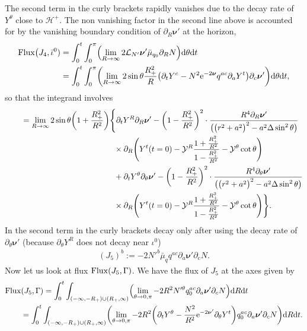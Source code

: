 \documentclass[11pt]{article}
\numberwithin{equation}{section}
\def\ptl{\partial}%
\def\mbo#1{\boldsymbol{#1}}%
\numberwithin{equation}{section}
\begin{document}
The second term in the curly brackets rapidly vanishes due to the decay rate of $Y^ \theta$ close to $\mathcal{H}^+$. The non vanishing factor in the second line above is accounted for by the vanishing boundary condition of $\ptl_R \mbo{\nu}'$ at the horizon,
\begin{align*}
{\rm Flux} \bigl(J_4, \bar{\iota}^0) &{}= \int^t_0 \int^\pi _0 \Bigl(\lim_{R \to \infty} 2 \mathcal{L}_{N'} \mbo{\nu}' \bar{\mu}_{q_0} \ptl_R N \Bigr) {\rm d}\theta {\rm d}t \notag \\
&{}= \int^t_0 \int^\pi _0 \biggl( \lim_{R \to \infty} 2 \sin \theta \frac{R^2_+}{R} \bigl(\ptl_t Y^c - N^2 {\rm e}^{-2 \mbo{\nu}} q^{ac} \ptl_a Y^t\bigr) \ptl_c \mbo{\nu}' \biggr) {\rm d} \theta {\rm d}t,
\end{align*}
so that the integrand involves
\begin{align*}
\qquad{} &{}= \lim_{R \to \infty} 2 \sin \theta \biggl(1+ \frac{R^2_+}{R^2} \biggr) \Biggl\{ \ptl_t Y^R \ptl_R \mbo{\nu}' - \biggl(1- \frac{R^2_+}{R^2} \biggr)^2 \cdot \frac{R^4 \ptl_R \mbo{\nu}'}{ \bigl(\bigl(r^2+a^2\bigr)^2 -a^2 \Delta
 	\sin^2 \theta \bigr)} \notag\\
 & \hphantom{= \lim_{R \to \infty} 2 \sin \theta \biggl(1+ \frac{R^2_+}{R^2} \biggr) \Biggl\{}{}
 \times \ptl_R \Biggl(Y^t (t=0) - \mathcal{Y}^R \frac{1 + \frac{R^2_+}{R^2}} {{1-\frac{R^2_+}{R^2}} } - \mathcal{Y}^ \theta \cot \theta \Biggr) \notag\\
 & \hphantom{= \lim_{R \to \infty} 2 \sin \theta \biggl(1+ \frac{R^2_+}{R^2} \biggr) \Biggl\{}{}
 + \ptl_t Y^ \theta \ptl_\theta \mbo{\nu}' - \biggl(1 - \frac{R^2_+}{R^2} \biggr)^2 \cdot \frac{R^4 \ptl_\theta \mbo{\nu}'}{ \bigl(\bigl(r^2+a^2\bigr)^2 -a^2 \Delta \sin^2 \theta\bigr)} \notag\\
 & \hphantom{= \lim_{R \to \infty} 2 \sin \theta \biggl(1+ \frac{R^2_+}{R^2} \biggr) \Biggl\{}{}
 \times \ptl_R \Biggl(Y^t(t=0) - \mathcal{Y}^R \frac{1+ \frac{R^2_+}{R^2}}{1-\frac{R^2_+}{R^2}} - \mathcal{Y}^\theta \cot \theta \Biggr) \Biggr\}.
\end{align*}
In the second term in the curly brackets decay only after using the decay rate of $\ptl_ \theta \mbo{\nu}'$ \big(because $ \ptl_\theta Y^R$ does not decay near $\iota^0$\big)
\begin{align*}
(J_5)^b := -2N'^b \bar{\mu}_q q^{ac} \ptl_a \mbo{\nu}' \ptl_c N.
\end{align*}
Now let us look at flux
${\rm Flux} (J_5, \Gamma)$.
We have the flux of $J_5$ at the axes given by
\begin{align*}
&{\rm Flux} (J_5, \Gamma)= \int^t_0 \int_{(-\infty, -R_+) \cup (R_+, \infty)} \Bigl(\lim_{\theta \to 0, \pi}-2 R^2 N'^ \theta q^{ac}_0 \ptl_a \mbo{\nu}' \ptl_c N\Bigr) {\rm d}R {\rm d}t \\
&\qquad{}= \int^t_0 \int_{(-\infty, -R_+) \cup (R_+, \infty)} \biggl(\lim_{\theta \to 0, \pi} -2 R^2 \biggl(\ptl_ t Y^\theta - \frac{N^2}{R^2} {\rm e}^{-2 \mbo{\nu}'} \ptl_\theta Y^t \biggr) q^{ac}_0 \ptl_a \mbo{\nu}' \ptl_c N\biggr) {\rm d}R {\rm d}t.
\end{align*}
\end{document}
